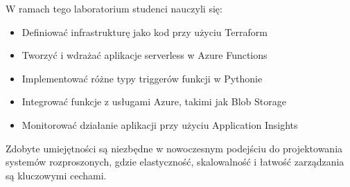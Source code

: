 \documentclass{article}
\begin{document}
W ramach tego laboratorium studenci nauczyli się:

\begin{itemize}
    \item Definiować infrastrukturę jako kod przy użyciu Terraform
    \item Tworzyć i wdrażać aplikacje serverless w Azure Functions
    \item Implementować różne typy triggerów funkcji w Pythonie
    \item Integrować funkcje z usługami Azure, takimi jak Blob Storage
    \item Monitorować działanie aplikacji przy użyciu Application Insights
\end{itemize}

Zdobyte umiejętności są niezbędne w nowoczesnym podejściu do projektowania systemów rozproszonych, gdzie elastyczność, skalowalność i łatwość zarządzania są kluczowymi cechami.
\end{document}
